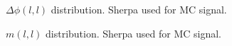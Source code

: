 \begin{figure}[h!tbp]
	\centering
	\hfill
	\caption{$\Delta\phi (l,l)$ distribution. Sherpa used for MC signal.}
	\label{AFig9S}
\end{figure} 

\begin{figure}[h!tbp]
	\centering
	\hfill
	\caption{$m(l,l)$ distribution. Sherpa used for MC signal.}
	\label{AFig10S}
\end{figure} 

